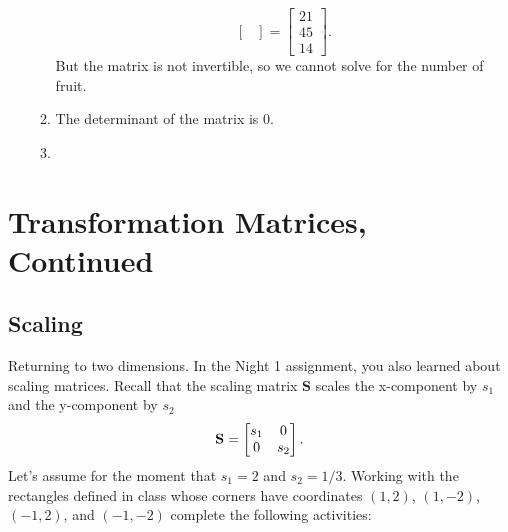 \begin{sol}
\begin{enumerate}
\begin{enumerate}
$$\begin{bmatrix}
        \end{bmatrix} = \begin{bmatrix}
        21 \\ 45 \\ 14
        \end{bmatrix}.$$
        But the matrix is not invertible, so we cannot solve for the number of fruit.
        \item The determinant of the matrix is 0.
        \item
    \end{enumerate}
\end{enumerate}
\end{sol}

\section{Transformation Matrices, Continued}

\subsection{Scaling}

Returning to two dimensions. In the Night 1 assignment, you also learned about scaling matrices. Recall that the scaling matrix $\mathbf{S}$ scales the x-component by $s_1$ and the y-component by $s_2$
\[ \mathbf{S} = \begin{bmatrix} s_1 & 0 \\ 0 & s_2\end{bmatrix}. \]
Let's assume for the moment that $s_1 = 2$ and $s_2 = 1/3$. Working with the rectangles defined in class whose corners have coordinates $(1,2)$, $(1,-2)$, $(-1,2)$, and $(-1,-2)$  complete the following activities:

